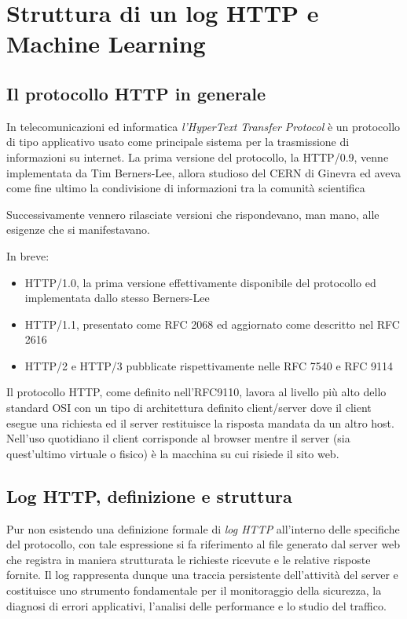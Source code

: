 \chapter{Struttura di un log HTTP e Machine Learning}
\section{Il protocollo HTTP in generale }
In telecomunicazioni ed informatica \emph{l’HyperText Transfer Protocol} è un protocollo di tipo applicativo usato come principale sistema per la trasmissione di informazioni su internet. La prima versione del protocollo, la HTTP/0.9, venne implementata da Tim Berners-Lee, allora studioso del CERN di Ginevra ed aveva come fine ultimo la condivisione di informazioni tra la comunità scientifica \parencite{berners1989}

Successivamente vennero rilasciate versioni che rispondevano, man mano, alle esigenze che si manifestavano.

In breve:
\begin{itemize}
    \item HTTP/1.0, la prima versione effettivamente disponibile del protocollo ed implementata dallo stesso Berners-Lee \parencite{rfc1945}
    \item HTTP/1.1, presentato come RFC 2068 \parencite{rfc2068} ed aggiornato come descritto nel RFC 2616 \parencite{rfc2616}
    \item HTTP/2 e HTTP/3 pubblicate rispettivamente nelle RFC 7540 \parencite{rfc7540}  e RFC 9114 \parencite{rfc9114}
\end{itemize}

Il protocollo HTTP, come definito nell’RFC9110, lavora al livello più alto dello standard OSI \parencite{rfc9110}  con un tipo di architettura definito client/server dove il client esegue una richiesta ed il server restituisce la risposta mandata da un altro host. Nell’uso quotidiano il client corrisponde al browser mentre il server (sia quest’ultimo virtuale o fisico) è la macchina su cui risiede il sito web.

\section{Log HTTP, definizione e struttura }
Pur non esistendo una definizione formale di \emph{log HTTP} all’interno delle specifiche del protocollo, con tale espressione si fa riferimento al file generato dal server web che registra in maniera strutturata le richieste ricevute e le relative risposte fornite. Il log rappresenta dunque una traccia persistente dell’attività del server e costituisce uno strumento fondamentale per il monitoraggio della sicurezza, la diagnosi di errori applicativi, l’analisi delle performance e lo studio del traffico.

